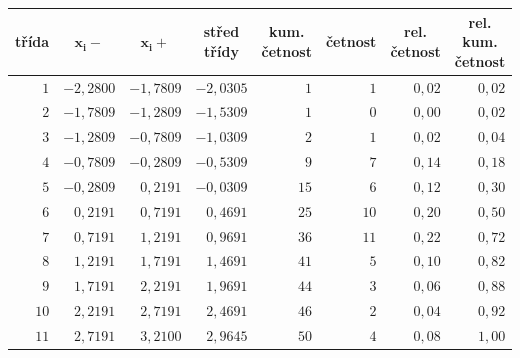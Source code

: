 \documentclass[a4paper, 11pt]{article}
\begin{document}
	\begin{table}[H]
		\centering
		\begin{tabular}{|r|r|r|r|r|r|r|r|}
			\hline
			\multicolumn{1}{|c|}{\textbf{třída}}
			& \multicolumn{1}{c|}{$ \boldsymbol{x_i-} $}
			& \multicolumn{1}{c|}{\textbf{$ \boldsymbol{x_i+} $}}
			& \multicolumn{1}{c|}{\textbf{střed třídy}}
			& \multicolumn{1}{c|}{\textbf{kum. četnost}}
			& \multicolumn{1}{c|}{\textbf{četnost}}
			& \multicolumn{1}{c|}{\textbf{rel. četnost}}
			& \multicolumn{1}{c|}{\textbf{rel. kum. četnost}}
			\\ \hline \hline

			$ 1 $ & $ -2,2800 $ & $ -1,7809 $ & $ -2,0305 $
			& $ 1 $ & $ 1 $ & $ 0,02 $ & $ 0,02 $ \\ \hline

			$ 2 $ & $ -1,7809 $ & $ -1,2809 $ & $ -1,5309 $
			& $ 1 $ & $ 0 $ & $ 0,00 $ & $ 0,02 $ \\ \hline

			$ 3 $ & $ -1,2809 $ & $ -0,7809 $ & $ -1,0309 $
			& $ 2 $ & $ 1 $ & $ 0,02 $ & $ 0,04 $ \\ \hline

			$ 4 $ & $ -0,7809 $ & $ -0,2809 $ & $ -0,5309 $
			& $ 9 $ & $ 7 $ & $ 0,14 $ & $ 0,18 $ \\ \hline

			$ 5 $ & $ -0,2809 $ & $ 0,2191 $ & $ -0,0309 $
			& $ 15 $ & $ 6 $ & $ 0,12 $ & $ 0,30 $ \\ \hline

			$ 6 $ & $ 0,2191 $ & $ 0,7191 $ & $ 0,4691 $
			& $ 25 $ & $ 10 $ & $ 0,20 $ & $ 0,50 $ \\ \hline

			$ 7 $ & $ 0,7191 $ & $ 1,2191 $ & $ 0,9691 $
			& $ 36 $ & $ 11 $ & $ 0,22 $ & $ 0,72 $ \\ \hline

			$ 8 $ & $ 1,2191 $ & $ 1,7191 $ & $ 1,4691 $
			& $ 41 $ & $ 5 $ & $ 0,10 $ & $ 0,82 $ \\ \hline

			$ 9 $ & $ 1,7191 $ & $ 2,2191 $ & $ 1,9691 $
			& $ 44 $ & $ 3 $ & $ 0,06 $ & $ 0,88 $ \\ \hline

			$ 10 $ & $ 2,2191 $ & $ 2,7191 $ & $ 2,4691 $
			& $ 46 $ & $ 2 $ & $ 0,04 $ & $ 0,92 $ \\ \hline

			$ 11 $ & $ 2,7191 $ & $ 3,2100 $ & $ 2,9645 $
			& $ 50 $ & $ 4 $ & $ 0,08 $ & $ 1,00 $ \\ \hline
		\end{tabular}
	\end{table}
\end{document}
